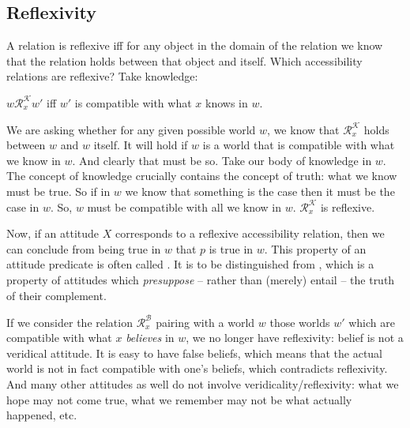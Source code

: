 \subsection{Reflexivity} \label{sec:reflexivity}

A relation is reflexive iff for any object in the domain of the relation we know
that the relation holds between that object and itself. Which accessibility
relations are reflexive? Take knowledge:

\ex $w\mathcal{R}^{\mathcal{K}}_{x}w'$ iff $w'$ is compatible with what $x$
knows in $w$. \xe

We %
%
are asking whether for any given possible world $w$, we know that
$\mathcal{R}^{\mathcal{K}}_{x}$ holds between $w$ and $w$ itself. It will hold
if $w$ is a world that is compatible with what we know in $w$. And clearly that
must be so. Take our body of knowledge in $w$. The concept of knowledge
crucially contains the concept of truth: what we know must be true. So if in $w$
we know that something is the case then it must be the case in $w$. So, $w$ must
be compatible with all we know in $w$. $\mathcal{R}^{\mathcal{K}}_{x}$ is
reflexive.

Now, if an attitude $X$ corresponds to a reflexive accessibility relation, then
we can conclude from  being true in $w$ that $p$
is true in $w$. %
%
This property of an attitude predicate is often called . It
is to be distinguished from , which is a property of attitudes
which \emph{presuppose} -- rather than (merely) entail -- the truth of their
complement.

If we consider the relation $\mathcal{R}^\mathcal{B}_{x}$ pairing with a world
$w$ those worlds $w'$ which are compatible with what $x$ \emph{believes} in $w$,
we no longer have reflexivity: belief is not a veridical attitude. %
%
It is easy to have false beliefs, which means that the actual world is not in
fact compatible with one's beliefs, which contradicts reflexivity. And many
other attitudes as well do not involve veridicality/reflexivity: what we hope
may not come true, what we remember may not be what actually happened, etc.

